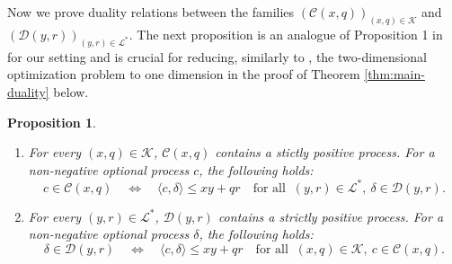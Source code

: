 \documentclass[11pt, oneside]{article}   	%
\theoremstyle{plain}
\newtheorem{prop}[thm]{Proposition}
\theoremstyle{definition}
\theoremstyle{remark}
\begin{document}
Now we prove duality relations between the families $(\mathcal{C}(x,q))_{(x,q)\in\mathcal{K}}$ and $(\mathcal{D}(y,r))_{(y,r)\in\mathcal{L}^*}$. The next proposition is an analogue of Proposition 1 in \cite{hug-kramkov} for our setting and is crucial for reducing, similarly to \cite{hug-kramkov}, the two-dimensional optimization problem to one dimension in the proof of Theorem \ref{thm:main-duality} below.
\begin{prop}\label{prop:conjugate-rel}
\begin{enumerate}
\item[(i)] For every $(x,q)\in\mathcal{K}$, $\mathcal{C}(x,q)$ contains a stictly positive process. For a non-negative optional process $c$, the following holds:
\begin{equation}\label{eq:C-characterization}
c\in\mathcal{C}(x,q)\quad\Leftrightarrow\quad \langle c,\delta \rangle\leq xy+qr\quad \text{for all } \ (y,r)\in\mathcal{L}^*,\ \delta\in\mathcal{D}(y,r).
\end{equation}
\item[(ii)] For every $(y,r)\in\mathcal{L}^*$, $\mathcal{D}(y,r)$ contains a strictly positive process. For a non-negative optional process $\delta$, the following holds:
\begin{equation}\label{eq:D-characterization}
\delta\in\mathcal{D}(y,r)\quad\Leftrightarrow\quad \langle c,\delta \rangle\leq xy+qr\quad \text{for all } \ (x,q)\in\mathcal{K},\ c\in\mathcal{C}(x,q).
\end{equation}
\end{enumerate}
\end{prop}
\end{document}
